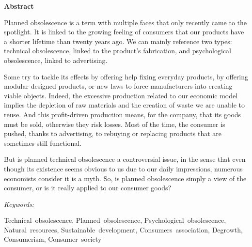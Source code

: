 

\begin{Large}
\textbf{Abstract}
\end{Large}

\vspace{1\baselineskip}

Planned obsolescence is a term with multiple faces that only recently came to the spotlight. It is linked to the growing feeling of consumers that our products have a shorter lifetime than twenty years ago. We can mainly reference two types: technical obsolescence, linked to the product’s fabrication, and psychological obsolescence, linked to advertising.

Some try to tackle its effects by offering help fixing everyday products, by offering modular designed products, or new laws to force manufacturers into creating viable objects. Indeed, the excessive production related to our economic model implies the depletion of raw materials and the creation of waste we are unable to reuse. And this profit-driven production means, for the company, that its goods must be sold, otherwise they risk losses. Most of the time, the consumer is pushed, thanks to advertising, to rebuying or replacing products that are sometimes still functional.

But is planned technical obsolescence a controversial issue, in the sense that even though its existence seems obvious to us due to our daily impressions, numerous economists consider it is a myth. So, is planned obsolescence simply a view of the consumer, or is it really applied to our consumer goods?
\vspace{\baselineskip}

\begin{large}\emph{Keywords:} \end{large}
 Technical~obsolescence, Planned~obsolescence, Psychological~obsolescence, \\Natural~resources, Sustainable~development, Consumers~association, Degrowth, Consumerism, Consumer~society

